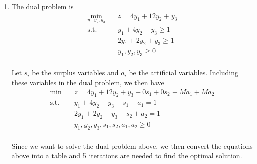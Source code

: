 \documentclass[a4paper,10pt]{article}
\begin{document}
\begin{enumerate}
\begin{enumerate}
{\begin{enumerate}
                The values of the slack variables are
                \begin{align}
                    \omega_1 = 0, \omega_2 = 0, \omega_3 = 3 
                \end{align}

            \item The dual problem is
                \begin{equation}
                    \begin{aligned}
                        \min_{y_1, y_2, y_3} \quad & z = 4y_1 + 12y_2 + y_3 \\
                        \textrm{s.t.}   \quad & y_1 + 4y_2 - y_3 \geq 1 \\
                                        \quad & 2y_1 + 2y_2 + y_3 \geq 1 \\
                                        \quad & y_1, y_2, y_3 \geq 0 \\
                    \end{aligned}
                \end{equation}

                Let $s_i$ be the surplus variables and $a_i$ be the artificial variables. Including these variables in the dual problem, we then have
                \begin{equation}
                    \begin{aligned}
                        \min \quad & z = 4y_1 + 12y_2 + y_3 + 0s_1 + 0s_2 + Ma_1 + Ma_2 \\
                        \textrm{s.t.}   \quad & y_1 + 4y_2 - y_3 - s_1 + a_1 =  1 \\
                                        \quad & 2y_1 + 2y_2 + y_3 - s_2 + a_2 = 1 \\
                                        \quad & y_1, y_2, y_3, s_1, s_2, a_1, a_2 \geq 0 \\
                    \end{aligned}
                \end{equation}

                Since we want to solve the dual problem above, we then convert the equations above into a table and 5 iterations are needed to find the optimal solution.


\end{enumerate}}
\end{enumerate}
\end{enumerate}
\end{document}
